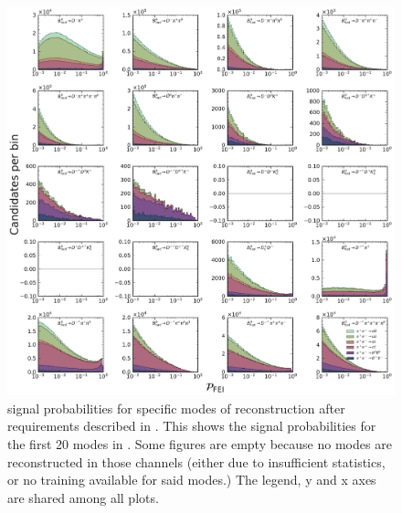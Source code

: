 \begin{figure}[htbp!]

    \includegraphics[width=1\textwidth]{figures/appendices/FEI_signal_probabilities/Bz_feiSigProbs1.pdf}

    \caption{\label{fig:feisigprobs3} \FEI signal probabilities for specific modes of \Bz reconstruction after requirements described in .
    This shows the signal probabilities for the first 20 \Bz modes in .
    Some figures are empty because no modes are reconstructed in those channels (either due to insufficient statistics, or no training available for said modes.)
    The legend, y and x axes are shared among all plots.
    }
\end{figure}

